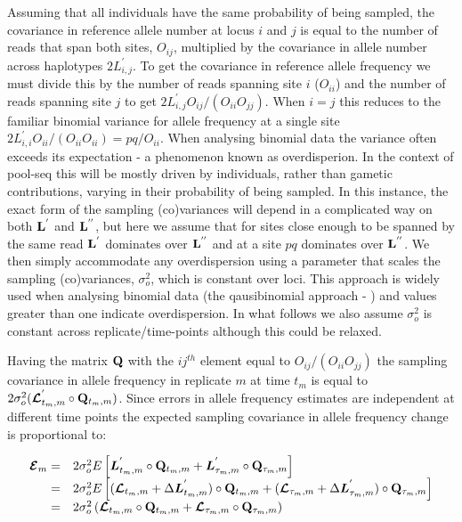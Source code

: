 \documentclass[12pt]{article}
\begin{document}
\begin{bibunit}
Assuming that all individuals have the same probability of being sampled, the covariance in reference allele number at locus $i$ and $j$ is equal to the number of reads that span both sites, $O_{ij}$, multiplied by the covariance in allele number across haplotypes $2L^{'}_{i,j}$. To get the covariance in reference allele frequency we must divide this by the number of reads spanning site $i$ ($O_{ii}$) and the number of reads spanning site $j$ to get $2L^{'}_{i,j}O_{ij}/(O_{ii}O_{jj})$. When $i=j$ this reduces to the familiar binomial variance for  allele frequency at a single site $2L^{'}_{i,i}O_{ii}/(O_{ii}O_{ii})=pq/O_{ii}$. When analysing binomial data the variance often exceeds its expectation - a phenomenon known as overdisperion. In the context of pool-seq this will be mostly driven by individuals, rather than gametic contributions, varying in their probability of being sampled. In this instance, the exact form of the sampling (co)variances will depend in a complicated way on both ${\bf L}^{'}$ and ${\bf L}^{''}$, but here we assume that for sites close enough to be spanned by the same read ${\bf L}^{'}$ dominates over ${\bf L}^{''}$ and at a site $pq$ dominates over ${\bf L}^{''}$. We then simply accommodate any overdispersion using a parameter that scales the sampling (co)variances, $\sigma^2_o$, which is constant over loci. This approach is widely used when analysing binomial data (the qausibinomial approach - \citep{McCullagh.1989}) and values greater than one indicate overdispersion. In what follows we also assume $\sigma^2_o$ is constant across replicate/time-points although this could be relaxed.

Having the matrix ${\bf Q}$ with the $ij^{th}$ element equal to $O_{ij}/(O_{ii}O_{jj})$ the sampling covariance in allele frequency in replicate $m$ at time $t_m$ is equal to $2\sigma^2_o(\boldsymbol{\mathcal L}^{'}_{t_m,m}\circ{\bf Q}_{t_m,m})$. Since errors in allele frequency estimates are independent at different time points the expected sampling covariance in allele frequency change is proportional to: 

\begin{equation}
\begin{array}{rl}
\boldsymbol{\mathcal{E}}_m =& 2\sigma^2_oE\left[\boldsymbol{L}^{'}_{t_m,m}\circ{\bf Q}_{t_m,m}+\boldsymbol{L}^{'}_{\tau_m,m}\circ{\bf Q}_{\tau_m,m}\right]\\
                  =& 2\sigma^2_oE\left[(\boldsymbol{\mathcal L}_{t_m,m}+\Delta\boldsymbol{L}^{'}_{t_m,m})\circ{\bf Q}_{t_m,m}+(\boldsymbol{\mathcal L}_{\tau_m,m}+\Delta\boldsymbol{L}^{'}_{\tau_m,m})\circ{\bf Q}_{\tau_m,m}\right]\\
                  =& 2\sigma^2_o\left(\boldsymbol{\mathcal L}_{t_m,m}\circ{\bf Q}_{t_m,m}+\boldsymbol{\mathcal L}_{\tau_m,m}\circ{\bf Q}_{\tau_m,m}\right)\\
\end{array}
\end{equation}


\end{bibunit}
\end{document}
